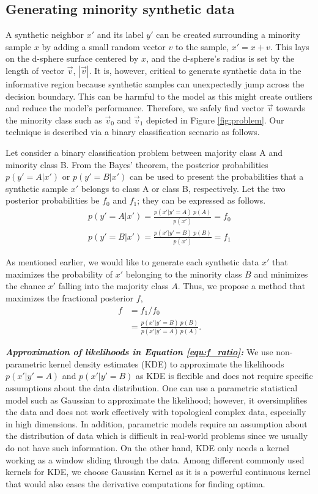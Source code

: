 \subsection{Generating minority synthetic data}  
A synthetic neighbor $ x'$ and its label $y'$ can be created surrounding a minority sample $x$ by adding a small random vector $v$ to the sample, $x' = x + v$. This lays on the d-sphere surface centered by $x$, and the d-sphere's radius is set by the length of vector $\vec{v}$, $|\vec{v}|$. It is, however, critical to generate synthetic data in the informative region because synthetic samples can unexpectedly jump across the decision boundary. This can be harmful to the model as this might create outliers and reduce the model's performance. Therefore, we safely find vector $\vec{v}$ towards the minority class such as $\vec{v}_0$ and $\vec{v}_1$ depicted in Figure \ref{fig:problem}. Our technique is described via a binary classification scenario as follows. 

Let consider a binary classification problem between majority class A and minority class B. 
From the Bayes' theorem, the posterior probabilities $p(y'=A|x')$ or $p(y'=B|x')$ can be used to present the probabilities that a synthetic sample $x'$ belongs to class A or class B, respectively. Let the two posterior probabilities be $f_0$ and $f_1$; they can be expressed as follows. 
\begin{align}
	\label{eq:posterior}
	p(y'=A|x') = \frac{p(x'|y'=A)\:p(A)}{p(x')} = f_0 \\
	p(y'=B|x') = \frac{p(x'|y'=B)\:p(B)}{p(x')} = f_1  
\end{align}

As mentioned earlier, we would like to generate each synthetic data $x'$ that maximizes the probability of $x'$ belonging to the minority class $B$ and minimizes the chance $x'$ falling into the majority class $A$. Thus, we propose a method that maximizes the fractional posterior $f$,   
\begin{align}
	\label{eq:fracpost}
	f &= f_1/f_0  \\
	&=\frac{p(x'|y'=B) \:p(B)}{p(x'|y'=A) \: p(A)}. \label{equ:f_ratio}
\end{align}


\textbf{\textit{Approximation of likelihoods in Equation \ref{equ:f_ratio}:}} We use non-parametric kernel density estimates (KDE) to approximate the likelihoods $p(x'|y'=A)$ and $p(x'|y'=B)$ as KDE is flexible and does not require specific assumptions about the data distribution. One can use a parametric statistical model such as Gaussian to approximate the likelihood; however, it oversimplifies the data and does not work effectively with topological complex data, especially in high dimensions. In addition, parametric models require an assumption about the distribution of data which is difficult in real-world problems since we usually do not have such information. On the other hand, KDE only needs a kernel working as a window sliding through the data. Among different commonly used kernels for KDE, we choose Gaussian Kernel as it is a powerful continuous kernel that would also eases the derivative computations for finding optima. 

